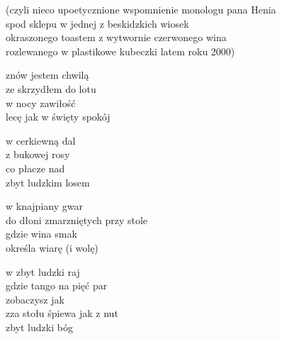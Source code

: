 \begin{text}
    (czyli nieco upoetycznione wspomnienie monologu pana Henia\\
    spod sklepu w jednej z beskidzkich wiosek\\
    okraszonego toastem z wytwornie czerwonego wina\\
    rozlewanego w plastikowe kubeczki latem roku 2000)

    znów jestem chwilą\\
    ze skrzydłem do lotu\\
    w nocy zawiłość\\
    lecę jak w święty spokój

    w cerkiewną dal\\
    z bukowej rosy\\
    co płacze nad\\
    zbyt ludzkim losem

    w knajpiany gwar\\
    do dłoni zmarzniętych przy stole\\
    gdzie wina smak\\
    określa wiarę (i wolę)

    w zbyt ludzki raj\\
    gdzie tango na pięć par\\
    zobaczysz jak\\
    zza stołu śpiewa jak z nut\\
    zbyt ludzki bóg
\end{text}
\begin{chord}

\end{chord}